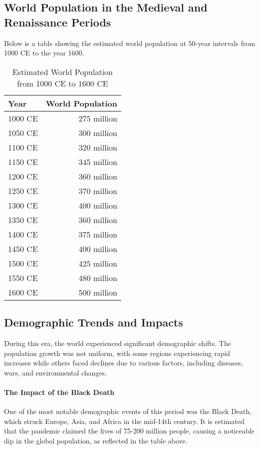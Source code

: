 \documentclass[a4paper,12pt]{book}
\begin{document}
\subsection*{World Population in the Medieval and Renaissance Periods}
Below is a table showing the estimated world population at 50-year intervals from 1000 CE to the year 1600.

\begin{table}[h!]
\centering
\begin{tabular}{|l|r|}
\hline
Year & World Population \\
\hline
1000 CE & 275 million \\
1050 CE & 300 million \\
1100 CE & 320 million \\
1150 CE & 345 million \\
1200 CE & 360 million \\
1250 CE & 370 million \\
1300 CE & 400 million \\
1350 CE & 360 million \\ %
1400 CE & 375 million \\
1450 CE & 400 million \\
1500 CE & 425 million \\
1550 CE & 480 million \\
1600 CE & 500 million \\
\hline
\end{tabular}
\caption{Estimated World Population from 1000 CE to 1600 CE}
\label{tab:world_population_1000_1600}
\end{table}

\subsection*{Demographic Trends and Impacts}
During this era, the world experienced significant demographic shifts. The population growth was not uniform, with some regions experiencing rapid increases while others faced declines due to various factors, including diseases, wars, and environmental changes.

\paragraph{The Impact of the Black Death}
One of the most notable demographic events of this period was the Black Death, which struck Europe, Asia, and Africa in the mid-14th century. It is estimated that the pandemic claimed the lives of 75-200 million people, causing a noticeable dip in the global population, as reflected in the table above.
\end{document}
